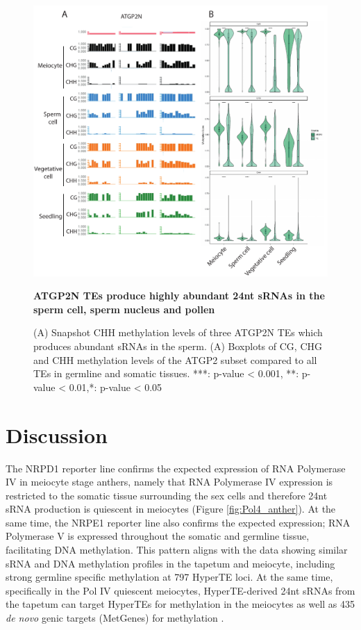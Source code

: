 \begin{figure}[htbp!] 
\centering    
    \includegraphics[width=1\textwidth]{Chapter2/Figs/Figure14_TE_methylation.pdf}
\caption{\textbf{ATGP2N TEs produce highly abundant 24nt sRNAs in the sperm cell, sperm nucleus and pollen}}
\label{fig:TE_methylation}
\captionsetup{font=small}
    \caption*{(A) Snapshot CHH methylation levels of three ATGP2N TEs which produces abundant sRNAs in the sperm. (A) Boxplots of CG, CHG and CHH methylation levels of the ATGP2 subset compared to all TEs in germline and somatic tissues. ***: p-value < 0.001, **: p-value < 0.01,*: p-value < 0.05}
\end{figure}

\clearpage

\section{Discussion}

The NRPD1 reporter line confirms the expected expression of RNA Polymerase IV in meiocyte stage anthers, namely that RNA Polymerase IV expression is restricted to the somatic tissue surrounding the sex cells and therefore 24nt sRNA production is quiescent in meiocytes (Figure \ref{fig:Pol4_anther}). At the same time, the NRPE1 reporter line also confirms the expected expression; RNA Polymerase V is expressed throughout the somatic and germline tissue, facilitating DNA methylation. This pattern aligns with the data showing similar sRNA and DNA methylation profiles in the tapetum and meiocyte, including strong germline specific methylation at 797 HyperTE loci. At the same time, specifically in the Pol IV quiescent meiocytes, HyperTE-derived 24nt sRNAs from the tapetum can target HyperTEs for methylation in the meiocytes as well as 435 \textit{de novo} genic targets (MetGenes) for methylation \cite{RN187,RN199}. 

